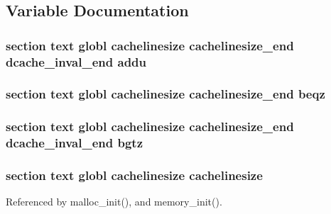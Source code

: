 \subsection{Variable Documentation}
\hypertarget{mips_2cache_8S_a37f1f1c43bf5f6e25669e6ed01da3ceb}{
\subsubsection[{addu}]{\setlength{\rightskip}{0pt plus 5cm}section text globl {\bf cachelinesize} {\bf cachelinesize\-\_\-end} {\bf dcache\-\_\-inval\-\_\-end} addu}}\label{mips_2cache_8S_a37f1f1c43bf5f6e25669e6ed01da3ceb}
\hypertarget{mips_2cache_8S_ae8f5e5b3e81e22b99c4bd415ca4da91d}{
\subsubsection[{beqz}]{\setlength{\rightskip}{0pt plus 5cm}section text globl {\bf cachelinesize} {\bf cachelinesize\-\_\-end} beqz}}\label{mips_2cache_8S_ae8f5e5b3e81e22b99c4bd415ca4da91d}
\hypertarget{mips_2cache_8S_a4b7de3228ae32f752501ac65564d183a}{
\subsubsection[{bgtz}]{\setlength{\rightskip}{0pt plus 5cm}section text globl {\bf cachelinesize} {\bf cachelinesize\-\_\-end} {\bf dcache\-\_\-inval\-\_\-end} bgtz}}\label{mips_2cache_8S_a4b7de3228ae32f752501ac65564d183a}
\hypertarget{mips_2cache_8S_a2ffad5962fec472ce41e46451bcd8f02}{
\subsubsection[{cachelinesize}]{\setlength{\rightskip}{0pt plus 5cm}section text globl cachelinesize cachelinesize}}\label{mips_2cache_8S_a2ffad5962fec472ce41e46451bcd8f02}


Referenced by malloc\-\_\-init(), and memory\-\_\-init().

